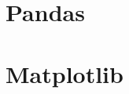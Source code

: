 \documentclass[numerate]{cheatsheet}
\begin{document}
\section{Pandas} %
    
    
    

\section{Matplotlib} %
    
    
    
    
\end{document}
